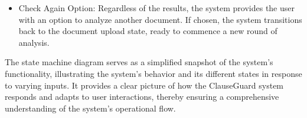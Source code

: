 \begin{itemize}
\begin{itemize}
\begin{itemize}
\begin{itemize}
                \end{itemize}
                \item Check Again Option: Regardless of the results, the system provides the user with an option to analyze another document. If chosen, the system transitions back to the document upload state, ready to commence a new round of analysis.
            \end{itemize}
The state machine diagram serves as a simplified snapshot of the system's functionality, illustrating the system's behavior and its different states in response to varying inputs. It provides a clear picture of how the ClauseGuard system responds and adapts to user interactions, thereby ensuring a comprehensive understanding of the system's operational flow.



        \end{itemize}
\end{itemize}